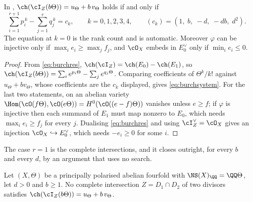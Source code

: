\begin{lemma}\label{lem:burchmoments}
In , $\ch(\cI_{Z}(b\Theta))=u_{\Theta}+b\,v_{\Theta}$ holds
if and only if
\begin{equation}\label{eq:burchsystem}
  \sum_{i=1}^{r+1}p_{i}^{\,k}-\sum_{j=1}^{r}q_{j}^{\,k}=c_{k},
  \qquad k=0,1,2,3,4,
  \qquad (c_{k})=(1,\;b,\;-d,\;-db,\;d^{2}).
\end{equation}
The equation at $k=0$ is the rank count and is automatic. Moreover
$\varphi$ can be injective only if $\max_{i}e_{i}\ge\max_{j}f_{j}$, and
$\cO_{X}$ embeds in $E_{0}^{\vee}$ only if $\min_{i}e_{i}\le0$.
\end{lemma}

\begin{proof}
From \eqref{eq:burchres}, $\ch(\cI_{Z})=\ch(E_{0})-\ch(E_{1})$, so
$\ch(\cI_{Z}(b\Theta))=\sum_{i}e^{p_{i}\Theta}-\sum_{j}e^{q_{j}\Theta}$.
Comparing coefficients of $\Theta^{k}/k!$ against $u_{\Theta}+bv_{\Theta}$,
whose coefficients are the $c_{k}$ displayed, gives
\eqref{eq:burchsystem}. For the last two statements, on an abelian variety
$\Hom(\cO(f\Theta),\cO(e\Theta))=H^{0}(\cO((e-f)\Theta))$ vanishes unless
$e\ge f$; if $\varphi$ is injective then each summand of $E_{1}$ must map
nonzero to $E_{0}$, which needs $\max_{i}e_{i}\ge f_{j}$ for every $j$.
Dualising \eqref{eq:burchres} and using $\cI_{Z}^{\vee}=\cO_{X}$ gives an
injection $\cO_{X}\hookrightarrow E_{0}^{\vee}$, which needs
$-e_{i}\ge0$ for some $i$.
\end{proof}

The case $r=1$ is the complete intersections, and it closes outright, for
every $b$ and every $d$, by an argument that uses no search.

\begin{theorem}%
\label{thm:noci}
Let $(X,\Theta)$ be a principally polarised abelian fourfold with
$\NS(X)_{\QQ}=\QQ\Theta$, let $d>0$ and $b\ge1$. No complete intersection
$Z=D_{1}\cap D_{2}$ of two divisors satisfies
$\ch(\cI_{Z}(b\Theta))=u_{\Theta}+b\,v_{\Theta}$.
\end{theorem}

